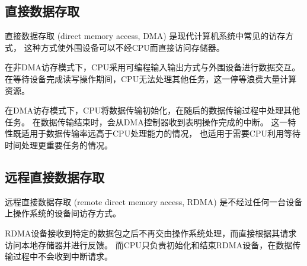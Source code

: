 \subsection{直接数据存取}
直接数据存取 (direct memory access, DMA) 是现代计算机系统中常见的访存方式，
这种方式使外围设备可以不经CPU而直接访问存储器。

在非DMA访存模式下，CPU采用可编程输入输出方式与外围设备进行数据交互。
在等待设备完成读写操作期间，CPU无法处理其他任务，这一停等浪费大量计算资源。

在DMA访存模式下，CPU将数据传输初始化，在随后的数据传输过程中处理其他任务。
在数据传输结束时，会从DMA控制器收到表明操作完成的中断。
这一特性既适用于数据传输率远高于CPU处理能力的情况，
也适用于需要CPU利用等待时间处理更重要任务的情况。

\subsection{远程直接数据存取}
远程直接数据存取 (remote direct memory access, RDMA) 是不经过任何一台设备上操作系统的设备间访存方式。

RDMA设备接收到特定的数据包之后不再交由操作系统处理，而直接根据其请求访问本地存储器并进行反馈。
而CPU只负责初始化和结束RDMA设备，在数据传输过程中不会收到中断请求。
